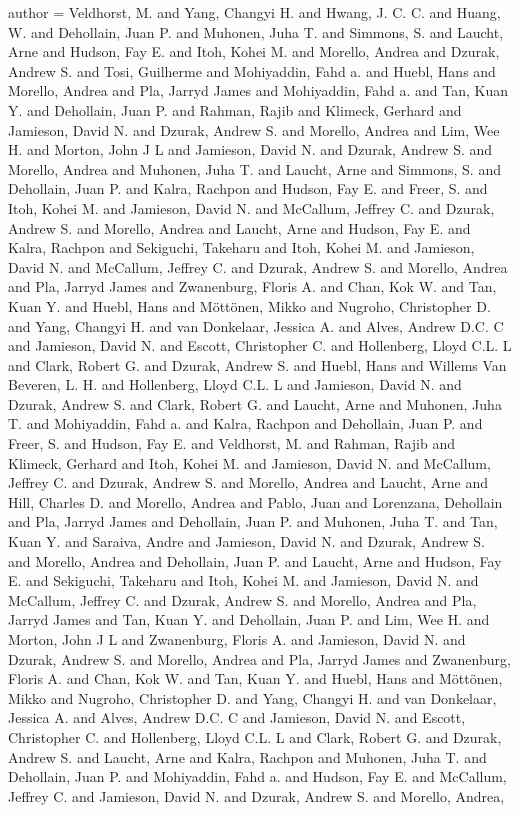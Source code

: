 {author = {Veldhorst, M. and Yang, Changyi H. and Hwang, J. C. C. and Huang, W. and Dehollain, Juan P. and Muhonen, Juha T. and Simmons, S. and Laucht, Arne and Hudson, Fay E. and Itoh, Kohei M. and Morello, Andrea and Dzurak, Andrew S. and Tosi, Guilherme and Mohiyaddin, Fahd a. and Huebl, Hans and Morello, Andrea and Pla, Jarryd James and Mohiyaddin, Fahd a. and Tan, Kuan Y. and Dehollain, Juan P. and Rahman, Rajib and Klimeck, Gerhard and Jamieson, David N. and Dzurak, Andrew S. and Morello, Andrea and Lim, Wee H. and Morton, John J L and Jamieson, David N. and Dzurak, Andrew S. and Morello, Andrea and Muhonen, Juha T. and Laucht, Arne and Simmons, S. and Dehollain, Juan P. and Kalra, Rachpon and Hudson, Fay E. and Freer, S. and Itoh, Kohei M. and Jamieson, David N. and McCallum, Jeffrey C. and Dzurak, Andrew S. and Morello, Andrea and Laucht, Arne and Hudson, Fay E. and Kalra, Rachpon and Sekiguchi, Takeharu and Itoh, Kohei M. and Jamieson, David N. and McCallum, Jeffrey C. and Dzurak, Andrew S. and Morello, Andrea and Pla, Jarryd James and Zwanenburg, Floris A. and Chan, Kok W. and Tan, Kuan Y. and Huebl, Hans and M{\"{o}}tt{\"{o}}nen, Mikko and Nugroho, Christopher D. and Yang, Changyi H. and van Donkelaar, Jessica A. and Alves, Andrew D.C. C and Jamieson, David N. and Escott, Christopher C. and Hollenberg, Lloyd C.L. L and Clark, Robert G. and Dzurak, Andrew S. and Huebl, Hans and {Willems Van Beveren}, L. H. and Hollenberg, Lloyd C.L. L and Jamieson, David N. and Dzurak, Andrew S. and Clark, Robert G. and Laucht, Arne and Muhonen, Juha T. and Mohiyaddin, Fahd a. and Kalra, Rachpon and Dehollain, Juan P. and Freer, S. and Hudson, Fay E. and Veldhorst, M. and Rahman, Rajib and Klimeck, Gerhard and Itoh, Kohei M. and Jamieson, David N. and McCallum, Jeffrey C. and Dzurak, Andrew S. and Morello, Andrea and Laucht, Arne and Hill, Charles D. and Morello, Andrea and Pablo, Juan and Lorenzana, Dehollain and Pla, Jarryd James and Dehollain, Juan P. and Muhonen, Juha T. and Tan, Kuan Y. and Saraiva, Andre and Jamieson, David N. and Dzurak, Andrew S. and Morello, Andrea and Dehollain, Juan P. and Laucht, Arne and Hudson, Fay E. and Sekiguchi, Takeharu and Itoh, Kohei M. and Jamieson, David N. and McCallum, Jeffrey C. and Dzurak, Andrew S. and Morello, Andrea and Pla, Jarryd James and Tan, Kuan Y. and Dehollain, Juan P. and Lim, Wee H. and Morton, John J L and Zwanenburg, Floris A. and Jamieson, David N. and Dzurak, Andrew S. and Morello, Andrea and Pla, Jarryd James and Zwanenburg, Floris A. and Chan, Kok W. and Tan, Kuan Y. and Huebl, Hans and M{\"{o}}tt{\"{o}}nen, Mikko and Nugroho, Christopher D. and Yang, Changyi H. and van Donkelaar, Jessica A. and Alves, Andrew D.C. C and Jamieson, David N. and Escott, Christopher C. and Hollenberg, Lloyd C.L. L and Clark, Robert G. and Dzurak, Andrew S. and Laucht, Arne and Kalra, Rachpon and Muhonen, Juha T. and Dehollain, Juan P. and Mohiyaddin, Fahd a. and Hudson, Fay E. and McCallum, Jeffrey C. and Jamieson, David N. and Dzurak, Andrew S. and Morello, Andrea},
}

